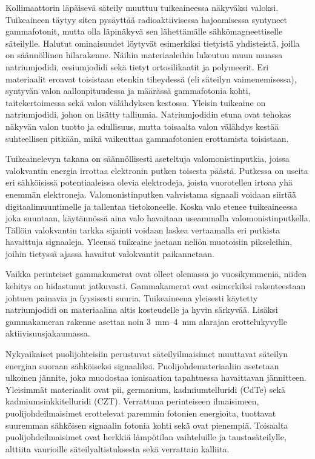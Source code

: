 Kollimaattorin läpäisevä säteily muuttuu tuikeaineessa näkyväksi valoksi. Tuikeaineen täytyy siten pysäyttää radioaktiivisessa hajoamisessa syntyneet gammafotonit, mutta olla läpinäkyvä sen lähettämälle sähkömagneettiselle säteilylle. Halutut ominaisuudet löytyvät esimerkiksi tietyistä yhdisteistä, joilla on säännöllinen hilarakenne. Näihin materiaaleihin lukeutuu muun muassa natriumjodidi, cesiumjodidi sekä tietyt ortosilikaatit ja polymeerit. Eri materiaalit eroavat toisistaan etenkin tiheydessä (eli säteilyn vaimenemisessa), syntyvän valon aallonpituudessa ja määrässä gammafotonia kohti, taitekertoimessa sekä valon välähdyksen kestossa.\cite{knoll_radiation_2010} Yleisin tuikeaine on natriumjodidi, johon on lisätty talliumia\cite{cherry_gamma_2012, cherry_single_2012, knoll_radiation_2010}. Natriumjodidin etuna ovat tehokas näkyvän valon tuotto ja edullisuus, mutta toisaalta valon välähdys kestää suhteellisen pitkään, mikä vaikeuttaa gammafotonien erottamista toisistaan\cite{knoll_radiation_2010}.

Tuikeainelevyn takana on säännöllisesti aseteltuja valomonistinputkia, joissa valokvantin energia irrottaa elektronin putken toisesta päästä. Putkessa on useita eri sähköisissä potentiaaleissa olevia elektrodeja, joista vuorotellen irtoaa yhä enemmän elektroneja. Valomonistinputken vahvistama signaali voidaan siirtää digitaalimuuntimelle ja tallentaa tietokoneelle.\cite{cherry_gamma_2012, knoll_radiation_2010} Koska valo etenee tuikeaineessa joka suuntaan, käytännössä aina valo havaitaan useammalla valomonistinputkella. Tällöin valokvantin tarkka sijainti voidaan laskea vertaamalla eri putkista havaittuja signaaleja. Yleensä tuikeaine jaetaan neliön muotoisiin pikseleihin, joihin tietyssä ajassa havaitut valokvantit paikannetaan\cite{cherry_gamma_2012, knoll_radiation_2010}.

Vaikka perinteiset gammakamerat ovat olleet olemassa jo vuosikymmeniä, niiden kehitys on hidastunut jatkuvasti. Gammakamerat ovat esimerkiksi rakenteestaan johtuen painavia ja fyysisesti suuria. Tuikeaineena yleisesti käytetty natriumjodidi on materiaalina altis kosteudelle ja hyvin särkyvää. Lisäksi gammakameran rakenne asettaa noin \qtyrange{3}{4}{\milli\meter} alarajan erottelukyvylle aktiivisuusjakaumassa.\cite{knoll_radiation_2010, taillefer_scintillation_2022}

Nykyaikaiset puolijohteisiin perustuvat säteilyilmaisimet muuttavat säteilyn energian suoraan sähköiseksi signaaliksi. Puolijohdemateriaaliin asetetaan ulkoinen jännite, joka muodostaa ionisaation tapahtuessa havaittavan jännitteen. Yleisimmät materiaalit ovat pii, germanium, kadmiumtelluridi (CdTe) sekä kadmiumsinkkitelluridi (CZT). Verrattuna perinteiseen ilmaisimeen, puolijohdeilmaisimet erottelevat paremmin fotonien energioita, tuottavat suuremman sähköisen signaalin fotonia kohti sekä ovat pienempiä. Toisaalta puolijohdeilmaisimet ovat herkkiä lämpötilan vaihteluille ja taustasäteilylle, alttiita vaurioille säteilyaltistuksesta sekä verrattain kalliita.\cite{taillefer_scintillation_2022, knoll_radiation_2010, slomka_novel_2022}


